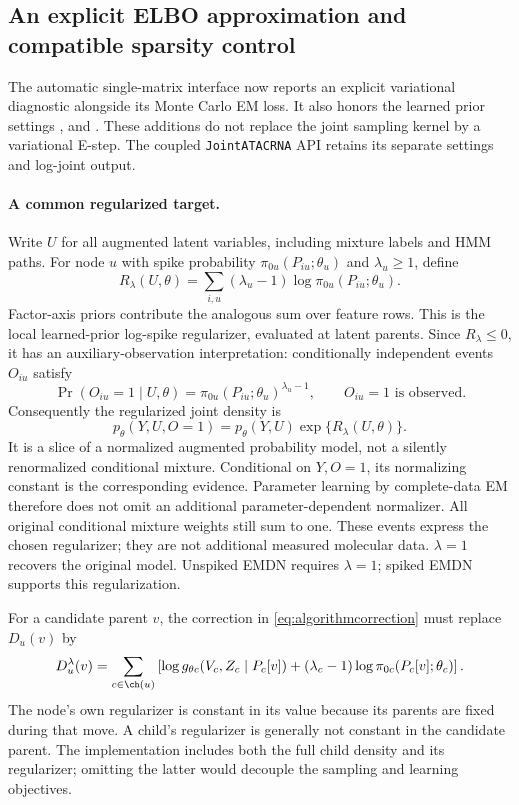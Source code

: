 \subsection{An explicit ELBO approximation and compatible sparsity control}
\label{sec:implementedelbo}
The automatic single-matrix interface now reports an explicit variational
diagnostic alongside its Monte Carlo EM loss. It also honors the learned
prior settings ,  and .
These additions do not replace the joint sampling kernel by a variational
E-step. The coupled \texttt{JointATACRNA} API retains its separate settings
and log-joint output.

\paragraph{A common regularized target.}
Write \(U\) for all augmented latent variables, including mixture labels
and HMM paths. For node \(u\) with spike probability
\(\pi_{0u}(P_{iu};\theta_u)\) and \(\lambda_u\geq1\), define
\begin{equation}
R_\lambda(U,\theta)=\sum_{i,u}(\lambda_u-1)
\log\pi_{0u}(P_{iu};\theta_u).
\label{eq:jointregularizer}
\end{equation}
Factor-axis priors contribute the analogous sum over feature rows. This is
the local learned-prior log-spike regularizer, evaluated at latent parents.
Since \(R_\lambda\leq0\), it has an auxiliary-observation interpretation:
conditionally independent events \(O_{iu}\) satisfy
\[
\Pr(O_{iu}=1\mid U,\theta)
=\pi_{0u}(P_{iu};\theta_u)^{\lambda_u-1},
\qquad O_{iu}=1\text{ is observed}.
\]
Consequently the regularized joint density is
\begin{equation}
p_\theta(Y,U,O=1)=p_\theta(Y,U)\exp\{R_\lambda(U,\theta)\}.
\label{eq:auxiliarytarget}
\end{equation}
It is a slice of a normalized augmented probability model, not a silently
renormalized conditional mixture. Conditional on \(Y,O=1\), its normalizing
constant is the corresponding evidence. Parameter learning by complete-data
EM therefore does not omit an additional parameter-dependent normalizer.
All original conditional mixture weights still sum to one. These events
express the chosen regularizer; they are not additional measured molecular
data. \(\lambda=1\) recovers the original model. Unspiked EMDN requires
\(\lambda=1\); spiked EMDN supports this regularization.

For a candidate parent \(v\), the correction in
\eqref{eq:algorithmcorrection} must replace \(D_u(v)\) by
\begin{equation}
D_u^\lambda(v)=\sum_{c\in\ch(u)}\left[
\log g_{\theta c}(V_c,Z_c\mid P_c[v])
+(\lambda_c-1)\log\pi_{0c}(P_c[v];\theta_c)\right].
\label{eq:regularizedchild}
\end{equation}
The node's own regularizer is constant in its value because its parents are
fixed during that move. A child's regularizer is generally not constant in
the candidate parent. The implementation includes both the full child
density and its regularizer; omitting the latter would decouple the
sampling and learning objectives.

